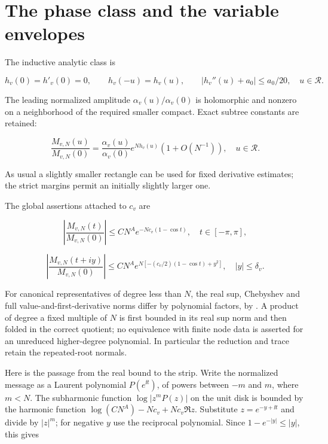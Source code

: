 \section{The phase class and the variable envelopes}\label{dt:sec-4}

The inductive analytic class is

\begin{equation}\label{dt:eq-27}
h_v(0)=h'_v(0)=0,\qquad h_v(-u)=h_v(u),\qquad
 |h_v''(u)+a_0|\le a_0/20,\quad u\in\mathcal R.
\end{equation}

The leading normalized amplitude \(\alpha_v(u)/\alpha_v(0)\) is holomorphic
and nonzero on a neighborhood of the required smaller compact. Exact
subtree constants are retained:

\begin{equation}\label{dt:eq-28}
\frac{M_{v,N}(u)}{M_{v,N}(0)}
 =\frac{\alpha_v(u)}{\alpha_v(0)}e^{Nh_v(u)}(1+O(N^{-1})),
                     \quad u\in\mathcal R.
\end{equation}

As usual a slightly smaller rectangle can be used for fixed derivative
estimates; the strict margins permit an initially slightly larger one.

The global assertions attached to \(c_v\) are

\begin{equation}\label{dt:eq-29}
\left|\frac{M_{v,N}(t)}{M_{v,N}(0)}\right|
          \le CN^A e^{-Nc_v(1-\cos t)},
                         \quad t\in[-\pi,\pi],
\end{equation}

\begin{equation}\label{dt:eq-30}
\left|\frac{M_{v,N}(t+iy)}{M_{v,N}(0)}\right|
 \le CN^A e^{N[-(c_v/2)(1-\cos t)+y^2]},
                      \quad |y|\le\delta_v.
\end{equation}

For canonical representatives of degree less than \(N\), the real sup,
Chebyshev and full value-and-first-derivative norms differ by polynomial
factors, by \cite[Lemma~2.1]{Summed}. A product of degree a fixed multiple
of \(N\) is first bounded in its real sup norm and then folded in the
correct quotient; no equivalence with finite node data is asserted for
an unreduced higher-degree polynomial. In particular the reduction and
trace retain the repeated-root normals.

Here is the passage from the real bound to the strip. Write the
normalized message as a Laurent polynomial \(P(e^{\ii t})\), of powers
between \(-m\) and \(m\), where \(m<N\). The subharmonic function
\(\log|z^mP(z)|\) on the unit disk is bounded by the harmonic
function \(\log(CN^A)-Nc_v+Nc_v\Re z\). Substitute
\(z=e^{-y+\ii t}\) and divide by \(|z|^m\); for negative \(y\)
use the reciprocal polynomial. Since \(1-e^{-|y|}\le|y|\), this gives

